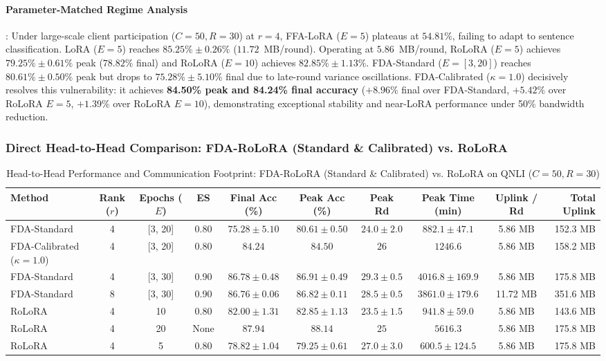 \documentclass[10pt,a4paper]{article}
\begin{document}
\paragraph{Parameter-Matched Regime Analysis}:
Under large-scale client participation ($C=50, R=30$) at $r=4$, FFA-LoRA ($E=5$) plateaus at $54.81\%$, failing to adapt to sentence classification. LoRA ($E=5$) reaches $85.25\% \pm 0.26\%$ ($11.72$~MB/round). Operating at $5.86$~MB/round, RoLoRA ($E=5$) achieves $79.25\% \pm 0.61\%$ peak ($78.82\%$ final) and RoLoRA ($E=10$) achieves $82.85\% \pm 1.13\%$. FDA-Standard ($E=[3,20]$) reaches $80.61\% \pm 0.50\%$ peak but drops to $75.28\% \pm 5.10\%$ final due to late-round variance oscillations. FDA-Calibrated ($\kappa=1.0$) decisively resolves this vulnerability: it achieves \textbf{84.50\% peak and 84.24\% final accuracy} ($+8.96\%$ final over FDA-Standard, $+5.42\%$ over RoLoRA $E=5$, $+1.39\%$ over RoLoRA $E=10$), demonstrating exceptional stability and near-LoRA performance under 50\% bandwidth reduction.

\subsubsection*{Direct Head-to-Head Comparison: FDA-RoLoRA (Standard \& Calibrated) vs. RoLoRA}
\begin{table}[H]
\centering
\caption{Head-to-Head Performance and Communication Footprint: FDA-RoLoRA (Standard \& Calibrated) vs. RoLoRA on QNLI ($C=50, R=30$)}
\label{tab:direct_qnli_c50_r30}
\scriptsize
\setlength{\tabcolsep}{1.4pt}
\begin{tabular*}{\textwidth}{@{\extracolsep{\fill}}lccccccccr@{}}
\toprule
\textbf{Method} & \textbf{Rank ($r$)} & \textbf{Epochs ($E$)} & \textbf{ES} & \textbf{Final Acc (\%)} & \textbf{Peak Acc (\%)} & \textbf{Peak Rd} & \textbf{Peak Time (min)} & \textbf{Uplink / Rd} & \textbf{Total Uplink} \\
\midrule
    FDA-Standard & 4 & [3, 20] & 0.80 & $75.28 \pm 5.10$ & $80.61 \pm 0.50$ & $24.0 \pm 2.0$ & $882.1 \pm 47.1$ & 5.86 MB & 152.3 MB \\
    FDA-Calibrated ($\kappa=1.0$) & 4 & [3, 20] & 0.80 & $84.24$ & $84.50$ & $26$ & $1246.6$ & 5.86 MB & 158.2 MB \\
    FDA-Standard & 4 & [3, 30] & 0.90 & $86.78 \pm 0.48$ & $86.91 \pm 0.49$ & $29.3 \pm 0.5$ & $4016.8 \pm 169.9$ & 5.86 MB & 175.8 MB \\
    FDA-Standard & 8 & [3, 30] & 0.90 & $86.76 \pm 0.06$ & $86.82 \pm 0.11$ & $28.5 \pm 0.5$ & $3861.0 \pm 179.6$ & 11.72 MB & 351.6 MB \\
    RoLoRA & 4 & 10 & 0.80 & $82.00 \pm 1.31$ & $82.85 \pm 1.13$ & $23.5 \pm 1.5$ & $941.8 \pm 59.0$ & 5.86 MB & 143.6 MB \\
    RoLoRA & 4 & 20 & None & $87.94$ & $88.14$ & $25$ & $5616.3$ & 5.86 MB & 175.8 MB \\
    RoLoRA & 4 & 5 & 0.80 & $78.82 \pm 1.04$ & $79.25 \pm 0.61$ & $27.0 \pm 3.0$ & $\mathbf{600.5 \pm 124.5}$ & 5.86 MB & 175.8 MB \\
\bottomrule
\end{tabular*}
\end{table}
\end{document}
